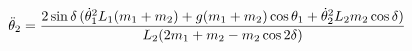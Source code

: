 \documentclass[preview]{standalone}
\begin{document}
\begin{align*}
\special{dvisvgm:raw <g id='unique000'>}\ddot{\theta}_2 = \frac{2\sin\delta\,(\dot{\theta}_1^2 L_1(m_1+m_2)+ g(m_1+m_2)\cos\theta_1+ \dot{\theta}_2^2 L_2 m_2 \cos\delta)}{L_2(2m_1+m_2 - m_2\cos 2\delta)}\special{dvisvgm:raw </g>}
\end{align*}
\end{document}
